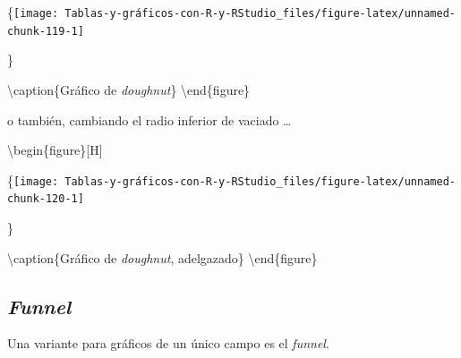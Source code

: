 \documentclass[
]{book}
\newenvironment{Shaded}{\begin{snugshade}}{\end{snugshade}}
\newcommand{\AttributeTok}[1]{\textcolor[rgb]{0.77,0.63,0.00}{#1}}
\newcommand{\ConstantTok}[1]{\textcolor[rgb]{0.00,0.00,0.00}{#1}}
\newcommand{\FunctionTok}[1]{\textcolor[rgb]{0.00,0.00,0.00}{#1}}
\newcommand{\NormalTok}[1]{#1}
\newcommand{\SpecialCharTok}[1]{\textcolor[rgb]{0.00,0.00,0.00}{#1}}
\newcommand{\StringTok}[1]{\textcolor[rgb]{0.31,0.60,0.02}{#1}}
\begin{document}
\{\centering \texttt{[image: Tablas-y-gráficos-con-R-y-RStudio\_files/figure-latex/unnamed-chunk-119-1]}

\}

\textbackslash caption\{Gráfico de \emph{doughnut}\}\label{fig:unnamed-chunk-119}
\textbackslash end\{figure\}

o también, cambiando el radio inferior de vaciado \ldots{}

\begin{Shaded}
\end{Shaded}

\textbackslash begin\{figure\}{[}H{]}

\{\centering \texttt{[image: Tablas-y-gráficos-con-R-y-RStudio\_files/figure-latex/unnamed-chunk-120-1]}

\}

\textbackslash caption\{Gráfico de \emph{doughnut}, adelgazado\}\label{fig:unnamed-chunk-120}
\textbackslash end\{figure\}

\hypertarget{funnel}{%
\subsection{\texorpdfstring{\emph{Funnel}}{Funnel}}\label{funnel}}

Una variante para gráficos de un único campo es el \emph{funnel}.
\end{document}
